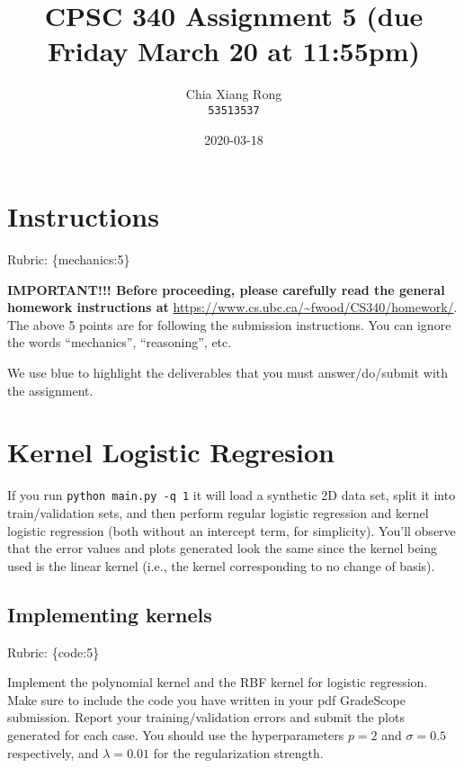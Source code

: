 \documentclass{article}
\def\rubric#1{\gre{Rubric: \{#1\}}}{}
\def\blu#1{{\color{blu}#1}}
\def\gre#1{{\color{gre}#1}}
\begin{document}
\title{CPSC 340 Assignment 5 (due Friday March 20 at 11:55pm)}
\author{Chia Xiang Rong \\
	\texttt{53513537}
}
\date{2020-03-18}
\maketitle

\vspace{-3em}


\section*{Instructions}
\rubric{mechanics:5}

\textbf{IMPORTANT!!! Before proceeding, please carefully read the general homework instructions at} \url{https://www.cs.ubc.ca/~fwood/CS340/homework/}. The above 5 points are for following the submission instructions. You can ignore the words ``mechanics'', ``reasoning'', etc.

\vspace{1em}
We use \blu{blue} to highlight the deliverables that you must answer/do/submit with the assignment.


\section{Kernel Logistic Regresion}

If you run \verb|python main.py -q 1| it will load a synthetic 2D data set, split it into train/validation sets, and then perform regular logistic regression and kernel logistic regression (both without an intercept term, for simplicity). You'll observe that the error values and plots generated look the same since the kernel being used is the linear kernel (i.e., the kernel corresponding to no change of basis).

\subsection{Implementing kernels}
\rubric{code:5}

 \blu{Implement the polynomial kernel and the RBF kernel for logistic regression. Make sure to include the code you have written in your pdf GradeScope submission. Report your training/validation errors and submit the plots generated for each case}. You should use the hyperparameters $p=2$ and $\sigma=0.5$ respectively, and $\lambda=0.01$ for the regularization strength.
\end{document}
